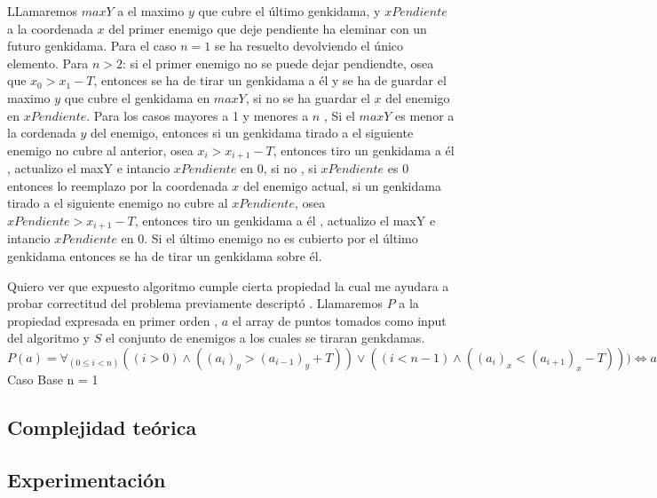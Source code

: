         LLamaremos $maxY$ a el maximo $y$ que cubre el último genkidama, y $xPendiente$ a la coordenada $x$ del primer enemigo que deje pendiente ha eleminar con un futuro genkidama.
        Para el caso $n = 1$ se ha resuelto devolviendo el único elemento. Para $n > 2$: si el primer enemigo no se puede dejar pendiendte, osea que $x_0 > x_1  - T$, entonces se ha de tirar un genkidama a él y se ha de guardar el maximo $y$ que cubre el genkidama en $maxY$, si no se ha guardar el $x$ del enemigo en $xPendiente$. Para los casos mayores a 1 y menores a $n$ , Si el $maxY$ es menor a la cordenada $y$ del enemigo, entonces si un genkidama tirado a el siguiente enemigo no cubre al anterior, osea $x_i > x_{i+1} - T$,  entonces tiro un genkidama a él , actualizo el maxY e intancio $xPendiente$ en $0$, si no , si $xPendiente$ es $0$ entonces lo reemplazo por la coordenada $x$ del enemigo actual, si un genkidama tirado a el siguiente enemigo no cubre al $xPendiente$, osea  $xPendiente > x_{i+1} - T$, entonces tiro un genkidama a él , actualizo el maxY e intancio $xPendiente$ en $0$. Si el último enemigo no es cubierto por el último genkidama entonces se ha de tirar un genkidama sobre él.

        Quiero ver que expuesto algoritmo cumple cierta propiedad la cual me ayudara a probar correctitud del problema previamente descriptó . Llamaremos $P$ a la propiedad expresada en primer orden , $a$ el array de puntos tomados como input del algoritmo y $S$ el conjunto de enemigos a los cuales se tiraran genkdamas. 
         $P(a) = \forall_{(0 \leq i < n)} ( (i > 0) \land ( (a_i)_y > (a_{i - 1})_y + T ) ) \lor ( (i < n-1) \land  ( (a_i)_x < (a_{i + 1})_x - T ) ) )  \iff  a_i \in S^\complement  $
        Caso Base n = 1



       
    \subsection{Complejidad teórica}
         
       


    \subsection{Experimentación}
